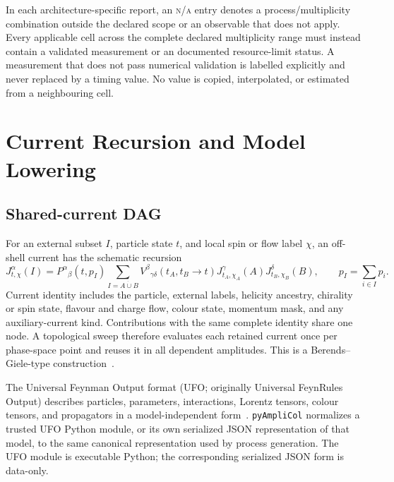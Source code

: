\documentclass[10pt,letterpaper]{article}
\newcommand{\PAC}{\texttt{pyAmpliCol}}
\newcommand{\ReportNA}{\textcolor{ReportMuted}{\textsc{n/a}}}
\begin{document}
In each architecture-specific report, an \ReportNA{} entry denotes a
process/multiplicity combination outside the declared scope or an observable
that does not apply. Every applicable cell across the complete declared
multiplicity range must instead contain a validated measurement or an
documented resource-limit status. A measurement that does not pass
numerical validation is labelled explicitly and never replaced by a timing
value. No value is copied, interpolated, or estimated from a neighbouring
cell.

\section{Current Recursion and Model Lowering}

\subsection{Shared-current DAG}

For an external subset $I$, particle state $t$, and local spin or flow label
$\chi$, an off-shell current has the schematic recursion
\begin{equation}
  J^{\alpha}_{t,\chi}(I)
  = P^{\alpha}{}_{\beta}(t,p_I)
    \sum_{I=A\mathbin{\dot\cup}B}
    V^{\beta}{}_{\gamma\delta}(t_A,t_B\!\to t)
    J^{\gamma}_{t_A,\chi_A}(A)
    J^{\delta}_{t_B,\chi_B}(B),
  \qquad p_I=\sum_{i\in I}p_i .
  \label{eq:recursion}
\end{equation}
Current identity includes the particle, external labels, helicity ancestry,
chirality or spin state, flavour and charge flow, colour state, momentum mask,
and any auxiliary-current kind. Contributions with the same complete identity
share one node. A topological sweep therefore evaluates each retained current
once per phase-space point and reuses it in all dependent amplitudes.
This is a Berends--Giele-type construction~\cite{BerendsGiele1988}.

The Universal Feynman Output format (UFO; originally Universal FeynRules
Output) describes particles, parameters, interactions, Lorentz tensors,
colour tensors, and propagators in a model-independent
form~\cite{UFO2012,UFO2023}. \PAC{} normalizes a trusted UFO Python module, or
its own serialized JSON representation of that model, to the same canonical
representation used by process generation. The UFO module is executable
Python; the corresponding serialized JSON form is data-only.
\end{document}
